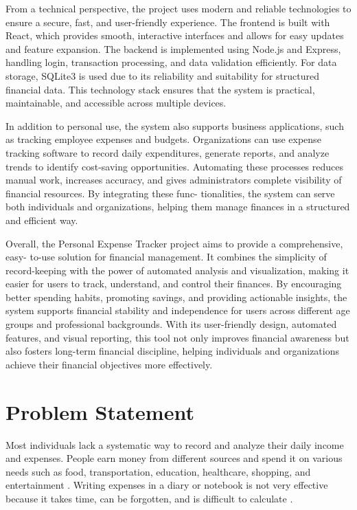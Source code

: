 \documentclass[12pt]{report}
\begin{document}
From a technical perspective, the project uses modern and reliable technologies to ensure
a secure, fast, and user-friendly experience. The frontend is built with React, which provides
smooth, interactive interfaces and allows for easy updates and feature expansion. The
backend is implemented using Node.js and Express, handling login, transaction processing,
and data validation efficiently. For data storage, SQLite3 is used due to its reliability and
suitability for structured financial data. This technology stack ensures that the system is
practical, maintainable, and accessible across multiple devices.

In addition to personal use, the system also supports business applications, such as
tracking employee expenses and budgets. Organizations can use expense tracking software
to record daily expenditures, generate reports, and analyze trends to identify cost-saving
opportunities. Automating these processes reduces manual work, increases accuracy, and
gives administrators complete visibility of financial resources. By integrating these func-
tionalities, the system can serve both individuals and organizations, helping them manage
finances in a structured and efficient way.

Overall, the Personal Expense Tracker project aims to provide a comprehensive, easy-
to-use solution for financial management. It combines the simplicity of record-keeping
with the power of automated analysis and visualization, making it easier for users to
track, understand, and control their finances. By encouraging better spending habits,
promoting savings, and providing actionable insights, the system supports financial stability
and independence for users across different age groups and professional backgrounds. With
its user-friendly design, automated features, and visual reporting, this tool not only improves
financial awareness but also fosters long-term financial discipline, helping individuals and
organizations achieve their financial objectives more effectively.

\section{Problem Statement}
Most individuals lack a systematic way to record and analyze their daily income and expenses.
People earn money from different sources and spend it on various needs such as food,
transportation, education, healthcare, shopping, and entertainment \cite{singh2021spending}.
Writing expenses in a diary or notebook is not very effective because it takes time, can be
forgotten, and is difficult to calculate \cite{manchanda2012expense}.
\end{document}
